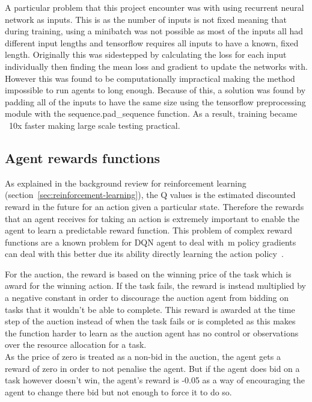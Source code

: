 A particular problem that this project encounter was with using recurrent neural network as inputs. This is as the
number of inputs is not fixed meaning that during training, using a minibatch was not possible as most of the inputs
all had different input lengths and tensorflow requires all inputs to have a known, fixed length. Originally this was
sidestepped by calculating the loss for each input individually then finding the mean loss and gradient to update the
networks with. However this was found to be computationally impractical making the method impossible to run agents to
long enough. Because of this, a solution was found by padding all of the inputs to have the same size using the
tensorflow preprocessing module with the sequence.pad\_sequence function. As a result, training became ~10x faster
making large scale testing practical.

\subsection{Agent rewards functions}\label{subsec:agent-rewards-functions}
As explained in the background review for reinforcement learning (section~\ref{sec:reinforcement-learning}),
the Q values is the estimated discounted reward in the future for an action given a particular state. Therefore the
rewards that an agent receives for taking an action is extremely important to enable the agent to learn a predictable
reward function. This problem of complex reward functions are a known problem for DQN agent to deal with~\citep{atari}m
policy gradients can deal with this better due its ability directly learning the action policy~\citep{Sutton1998}.

For the auction, the reward is based on the winning price of the task which is award for the winning action. If the
task fails, the reward is instead multiplied by a negative constant in order to discourage the auction agent from
bidding on tasks that it wouldn't be able to complete. This reward is awarded at the time step of the auction instead of
when the task fails or is completed as this makes the function harder to learn as the auction agent has no control or
observations over the resource allocation for a task. \\
As the price of zero is treated as a non-bid in the auction, the agent gets a reward of zero in order to not
penalise the agent. But if the agent does bid on a task however doesn't win, the agent's reward is -0.05 as a way of
encouraging the agent to change there bid but not enough to force it to do so.

